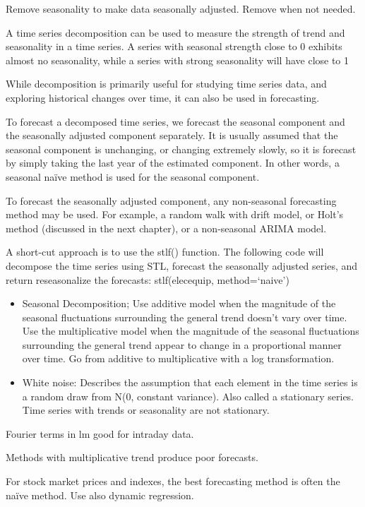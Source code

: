 \documentclass[]{book}
\begin{document}
Remove seasonality to make data seasonally adjusted. Remove when not
needed.

A time series decomposition can be used to measure the strength of trend
and seasonality in a time series. A series with seasonal strength close
to 0 exhibits almost no seasonality, while a series with strong
seasonality will have close to 1

While decomposition is primarily useful for studying time series data,
and exploring historical changes over time, it can also be used in
forecasting.

To forecast a decomposed time series, we forecast the seasonal component
and the seasonally adjusted component separately. It is usually assumed
that the seasonal component is unchanging, or changing extremely slowly,
so it is forecast by simply taking the last year of the estimated
component. In other words, a seasonal naïve method is used for the
seasonal component.

To forecast the seasonally adjusted component, any non-seasonal
forecasting method may be used. For example, a random walk with drift
model, or Holt's method (discussed in the next chapter), or a
non-seasonal ARIMA model.

A short-cut approach is to use the stlf() function. The following code
will decompose the time series using STL, forecast the seasonally
adjusted series, and return reseasonalize the forecasts: stlf(elecequip,
method=`naive')

\begin{itemize}
\item
  Seasonal Decomposition; Use additive model when the magnitude of the
  seasonal fluctuations surrounding the general trend doesn't vary over
  time. Use the multiplicative model when the magnitude of the seasonal
  fluctuations surrounding the general trend appear to change in a
  proportional manner over time. Go from additive to multiplicative with
  a log transformation.
\item
  White noise: Describes the assumption that each element in the time
  series is a random draw from N(0, constant variance). Also called a
  stationary series. Time series with trends or seasonality are not
  stationary.
\end{itemize}

Fourier terms in lm good for intraday data.

Methods with multiplicative trend produce poor forecasts.

For stock market prices and indexes, the best forecasting method is
often the naïve method. Use also dynamic regression.
\end{document}
